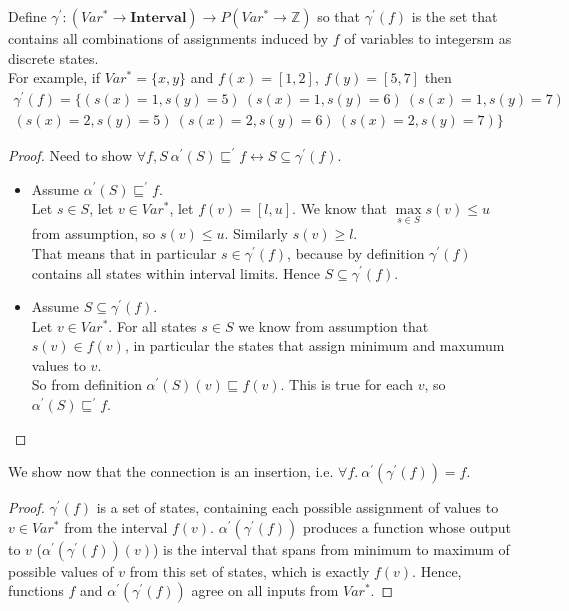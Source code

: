 Define $\gamma^\prime:(Var^*\rightarrow \mathbf{Interval})\rightarrow P(Var^*\rightarrow \mathbb{Z})$ so that $\gamma^\prime(f)$ is the set that contains all combinations of assignments induced by $f$ of variables to integersm as discrete states.\\
For example, if $Var^* = \{x,y\}$ and $f(x)=[1,2],\ f(y)=[5,7]$ then
\begin{align*}
\gamma^\prime(f)=\{(s(x)=1,s(y)=5)\ (s(x)=1,s(y)=6)\ (s(x)=1,s(y)=7)\\ (s(x)=2,s(y)=5)\ (s(x)=2,s(y)=6)\ (s(x)=2,s(y)=7)\}
\end{align*}
\begin{proof}
	Need to show $\forall f,S\ \alpha^\prime(S)\sqsubseteq^\prime f \leftrightarrow S\subseteq \gamma^\prime(f)$.
	\begin{itemize}
	\item Assume $\alpha^\prime(S)\sqsubseteq^\prime f$.\\
	Let $s\in S$, let $v\in Var^*$, let $f(v)=[l,u]$. We know that $\max\limits_{s\in S}s(v)\leq u$ from assumption, so $s(v)\leq u$. Similarly $s(v)\geq l$.\\
	That means that in particular $s\in \gamma^\prime(f)$, because by definition $\gamma^\prime(f)$ contains all states within interval limits. Hence $S\subseteq \gamma^\prime(f)$.
	\item Assume $S\subseteq \gamma^\prime(f)$.\\
	Let $v\in Var^*$. For all states $s\in S$ we know from assumption that $s(v)\in f(v)$, in particular the states that assign minimum and maxumum values to $v$.\\
	So from definition $\alpha^\prime(S)(v)\sqsubseteq f(v)$. This is true for each $v$, so $\alpha^\prime(S)\sqsubseteq^\prime f$.
	\end{itemize}
\end{proof}
We show now that the connection is an insertion, i.e. $\forall f.\ \alpha^\prime(\gamma^\prime(f))=f$.
\begin{proof}
	$\gamma^\prime(f)$ is a set of states, containing each possible assignment of values to $v\in Var^*$ from the interval $f(v)$. $\alpha^\prime(\gamma^\prime(f))$ produces a function whose output to $v$ ($\alpha^\prime(\gamma^\prime(f))(v)$) is the interval that spans from minimum to maximum of possible values of $v$ from this set of states, which is exactly $f(v)$. Hence, functions $f$ and $\alpha^\prime(\gamma^\prime(f))$ agree on all inputs from $Var^*$.
\end{proof}